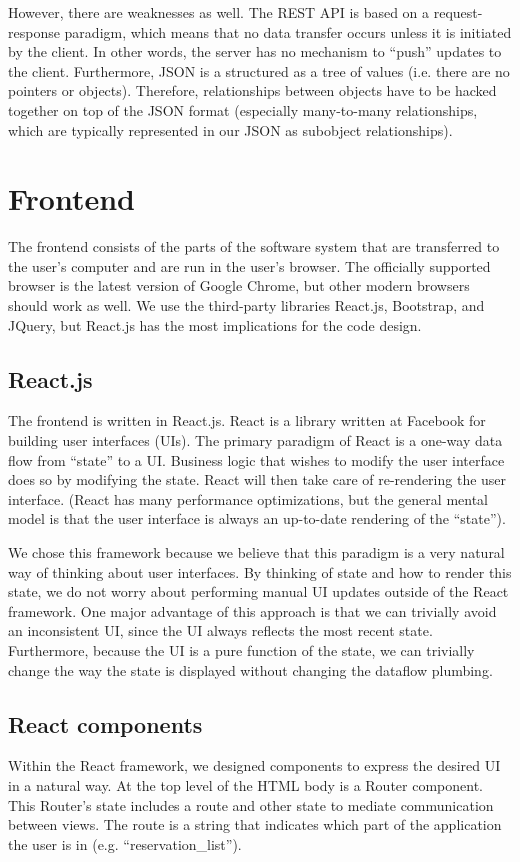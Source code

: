 \documentclass[12pt]{article}
\begin{document}
However, there are weaknesses as well. The REST API is based on a request-response paradigm, which means that no data transfer occurs unless it is initiated by the client. In other words, the server has no mechanism to ``push'' updates to the client. Furthermore, JSON is a structured as a tree of values (i.e. there are no pointers or objects). Therefore, relationships between objects have to be hacked together on top of the JSON format (especially many-to-many relationships, which are typically represented in our JSON as subobject relationships).

\section{Frontend}
The frontend consists of the parts of the software system that are transferred to the user's computer and are run in the user's browser. The officially supported browser is the latest version of Google Chrome, but other modern browsers should work as well. We use the third-party libraries React.js, Bootstrap, and JQuery, but React.js has the most implications for the code design.

\subsection{React.js}
The frontend is written in React.js. React is a library written at Facebook for building user interfaces (UIs). The primary paradigm of React is a one-way data flow from ``state'' to a UI. Business logic that wishes to modify the user interface does so by modifying the state. React will then take care of re-rendering the user interface. (React has many performance optimizations, but the general mental model is that the user interface is always an up-to-date rendering of the ``state'').

We chose this framework because we believe that this paradigm is a very natural way of thinking about user interfaces. By thinking of state and how to render this state, we do not worry about performing manual UI updates outside of the React framework. One major advantage of this approach is that we can trivially avoid an inconsistent UI, since the UI always reflects the most recent state. Furthermore, because the UI is a pure function of the state, we can trivially change the way the state is displayed without changing the dataflow plumbing.

\subsection{React components}
Within the React framework, we designed components to express the desired UI in a natural way. At the top level of the HTML body is a Router component. This Router's state includes a route and other state to mediate communication between views. The route is a string that indicates which part of the application the user is in (e.g. ``reservation\_list'').
\end{document}
